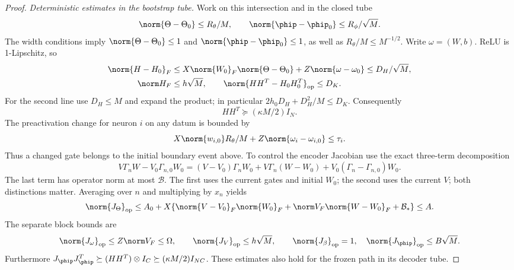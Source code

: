 \begin{proof}
\emph{Deterministic estimates in the bootstrap tube.}
Work on this intersection and in the closed tube
\[
 \norm{\Theta-\Theta_0}\le R_\theta/M,\qquad
 \norm{\phip-\phip_0}\le R_\phi/\sqrt M.
\]
The width conditions imply $\norm{\Theta-\Theta_0}\le1$ and
$\norm{\phip-\phip_0}\le1$, as well as
$R_\theta/M\le M^{-1/2}$. Write $\omega=(W,b)$.
ReLU is 1-Lipschitz, so
\begin{align*}
 \norm{H-H_0}_F
 &\le X\norm{W_0}_F\norm{\Theta-\Theta_0}
        +Z\norm{\omega-\omega_0}
 \le D_H/\sqrt M,\\
 \norm H_F&\le h\sqrt M,\qquad
 \norm{HH^T-H_0H_0^T}_{\rm op}\le D_K.
\end{align*}
For the second line use $D_H\le M$ and expand the product; in
particular $2h_0D_H+D_H^2/M\le D_K$.
Consequently
\begin{equation}\label{eq:astra_headfloor}
 HH^T\succeq(\kappa M/2)I_N.
\end{equation}
The preactivation change for neuron $i$ on any datum is bounded by
\[X\norm{w_{i,0}}R_\theta/M+Z\norm{\omega_i-\omega_{i,0}}\le\tau_i.\]
Thus a changed gate belongs to the initial boundary event above.
To control the encoder Jacobian use the exact three-term decomposition
\begin{equation}\label{eq:astra_three_terms}
 V\Gamma_nW-V_0\Gamma_{n,0}W_0
 =(V-V_0)\Gamma_nW_0+V\Gamma_n(W-W_0)
       +V_0(\Gamma_n-\Gamma_{n,0})W_0.
\end{equation}
The last term has operator norm at most $\mathcal B$. The first
uses the current gates and initial $W_0$; the second uses the current
$V$; both distinctions matter. Averaging over $n$ and multiplying by
$x_n$ yields
\[
 \norm{J_\Theta}_{\rm op}
 \le A_0+X\{\norm{V-V_0}_F\norm{W_0}_F
       +\norm V_F\norm{W-W_0}_F+\mathcal B_*\}\le A.
\]
The separate block bounds are
\[
 \norm{J_\omega}_{\rm op}\le Z\norm V_F\le\Omega,\qquad
 \norm{J_V}_{\rm op}\le h\sqrt M,\qquad
 \norm{J_\beta}_{\rm op}=1,
 \quad \norm{J_\phip}_{\rm op}\le B\sqrt M.
\]
Furthermore $J_\phip J_\phip^T\succeq
(HH^T)\otimes I_C\succeq(\kappa M/2)I_{NC}$.
These estimates also hold for the frozen path in its decoder tube.


\end{proof}

